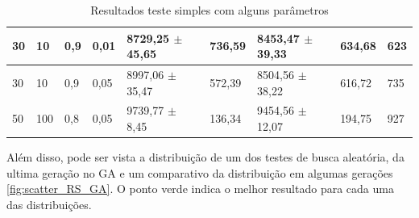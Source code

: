 \begin{table}[h]
\begin{tabular}{|l|l|l|l|l|l|l|l|l|}
		30    & 10     & 0,9	& 0,01    & 8729,25 $\pm$ 45,65     & 736,59    & 8453,47 $\pm$ 39,33       & 634,68        & 623                                                            \\ \hline
		30    & 10     & 0,9	& 0,05    & 8997,06 $\pm$ 35,47     & 572,39    & 8504,56 $\pm$ 38,22       & 616,72        & 735                                                            \\ \hline
		50    & 100    & 0,8	& 0,05    & 9739,77 $\pm$ 8,45      & 136,34    & 9454,56 $\pm$ 12,07       & 194,75       & 927                                                            \\ \hline
	\end{tabular}
	\caption{Resultados teste simples com alguns parâmetros}
	\label{tab:resultados_teste1}
\end{table}

Além disso, pode ser vista a distribuição de um dos testes de busca aleatória, da ultima geração no GA e um comparativo da distribuição em algumas gerações \autoref{fig:scatter_RS_GA}. O ponto verde indica o melhor resultado para cada uma das distribuições. 

